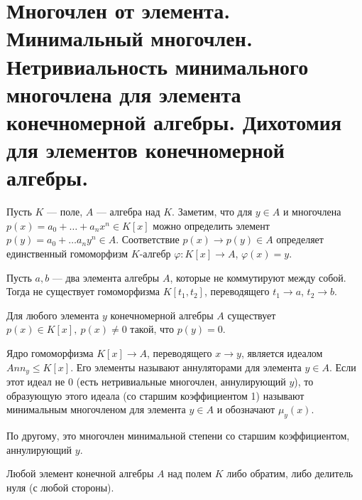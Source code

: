 \section{Многочлен от элемента. Минимальный многочлен. Нетривиальность минимального многочлена для элемента конечномерной алгебры. Дихотомия для элементов конечномерной алгебры.}
\begin{note}
    Пусть $ K$ --- поле, $ A$ --- алгебра над  $ K$. Заметим, что для  $ y \in A$ и многочлена $ p(x) = a_0+\ldots +a_n x^{n} \in K[x]$ можно определить элемент $ p(y) = a_0+\ldots a_ny^{n} \in A$. Соответствие $ p(x) \to p(y) \in A$ определяет единственный гомоморфизм $ K$-алгебр $ \varphi \colon K[x] \to  A$, $ \varphi (x) = y$. 
\end{note}
\begin{note}
    Пусть $ a, b$ --- два элемента алгебры  $ A$, которые не коммутируют между собой. Тогда не существует гомоморфизма $ K[t_1, t_2]$, переводящего $ t_1 \to  a$, $ t_2 \to  b$. 
\end{note}
\begin{st}
    Для любого элемента $ y $ конечномерной алгебры  $ A$ существует   $ p(x) \in K[x], ~p(x) \ne 0$ такой, что $ p(y) = 0$.
\end{st}
\begin{defn}[Аннуляторы]
    Ядро гомоморфизма $ K[x] \to  A$, переводящего $ x \to  y$, является идеалом $ Ann_y \le K[x]$. Его элементы называют {\sf аннуляторами} для элемента $ y \in A$. Если этот идеал  не 0 (есть нетривиальные многочлен, аннулирующий $ y$), то образующую этого идеала (со старшим коэффициентом 1) называют  {\sf минимальным многочленом}  для элемента $ y \in A$ и обозначают $ \mu_y(x)$. 

    По другому, это многочлен минимальной степени со старшим коэффициентом, аннулирующий $ y$.
\end{defn}
\begin{thm}
    Любой элемент конечной алгебры $ A$ над полем  $ K$ либо обратим, либо делитель нуля (с любой стороны).
\end{thm}
